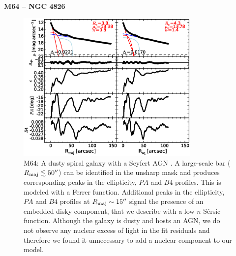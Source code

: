 \documentclass[preprint2]{emulateapj}
\newcommand{\fitfigurewidth}{0.8\textwidth}
\begin{document}
  \clearpage\newpage\noindent
  {\bf M64 -- NGC 4826 \\}
  
  \begin{figure}[h]
  \begin{center}
  \includegraphics[width=\fitfigurewidth]{images/m64_1Dfit.eps}
  \caption{M64: 
  A dusty spiral galaxy with a Seyfert AGN \citep{veroncettyveron2006}. 
  A large-scale bar ($R_{\rm maj} \lesssim 50''$) can be identified in the unsharp mask 
  and produces corresponding peaks in the ellipticity, $PA$ and $B4$ profiles.
  This is modeled with a Ferrer function.
  Additional peaks in the ellipticity, $PA$ and $B4$ profiles at $R_{\rm maj} \sim 15''$ 
  signal the presence of an embedded disky component, that we describe with a low-$n$ S\'ersic function.
  Although the galaxy is dusty and hosts an AGN, we do not observe any nuclear excess of light 
  in the fit residuals and therefore we found it unnecessary to add a nuclear component to our model. 
  }
  \end{center}
  \end{figure}
\end{document}
